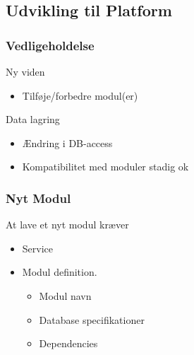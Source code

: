 \subsection{Udvikling til Platform}
\begin{frame}
\frametitle{Vedligeholdelse}
Ny viden
\begin{itemize}
\item Tilføje/forbedre modul(er)
\end{itemize}
Data lagring
\begin{itemize}
\item Ændring i DB-access
\item Kompatibilitet med moduler stadig ok
\end{itemize}
\end{frame}

\begin{frame}
\frametitle{Nyt Modul}
At lave et nyt modul kræver
\begin{itemize}
\item Service
\item Modul definition.
\begin{itemize}
\item Modul navn
\item Database specifikationer
\item Dependencies
\end{itemize}
\end{itemize}
\end{frame}

